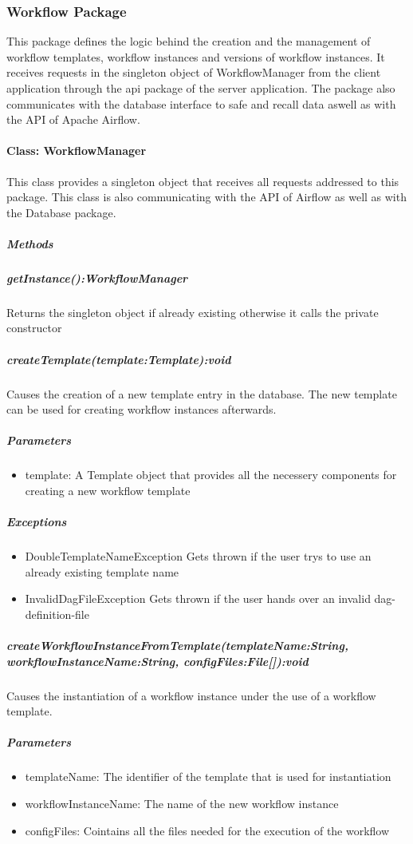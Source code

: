 \subsubsection{Workflow Package}
This package defines the logic behind the creation and the management of workflow templates, workflow instances and versions of workflow instances. It receives requests in the singleton object of WorkflowManager from the client application through the api package of the server application. The package also communicates with the database interface to safe and recall data aswell as with the API of Apache Airflow.

\paragraph{Class: WorkflowManager}
This class provides a singleton object that receives all requests addressed to this package. This class is also communicating with the API of Airflow as well as with the Database package.
\subparagraph{Methods}

\subparagraph{getInstance():WorkflowManager}
Returns the singleton object if already existing otherwise it calls the private constructor

\subparagraph{createTemplate(template:Template):void}
Causes the creation of a new template entry in the database. The new template can be used for creating workflow instances afterwards.

\subparagraph{Parameters}
\begin{itemize}
	\item{template:}
	A Template object that provides all the necessery components for creating a new workflow template
\end{itemize}

\subparagraph{Exceptions}
\begin{itemize}
	\item{DoubleTemplateNameException}
	Gets thrown if the user trys to use an already existing template name
	\item{InvalidDagFileException}
	Gets thrown if the user hands over an invalid dag-definition-file
\end{itemize}

\subparagraph{createWorkflowInstanceFromTemplate(templateName:String, workflowInstanceName:String, configFiles:File[]):void}
Causes the instantiation of a workflow instance under the use of a workflow template. 

\subparagraph{Parameters}
\begin{itemize}
	\item{templateName:}
	The identifier of the template that is used for instantiation
	\item{workflowInstanceName:}
	The name of the new workflow instance
	\item{configFiles:}
	Cointains all the files needed for the execution of the workflow
\end{itemize}

